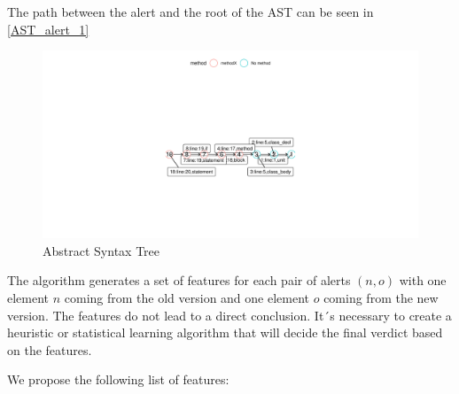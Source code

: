 \documentclass[
]{article}
\begin{document}
\normalsize

The path between the alert and the root of the AST can be seen in
\ref{AST_alert_1}

\small

\begin{figure}[H]
\includegraphics[width=1\linewidth]{match_algorithm_description_files/figure-latex/unnamed-chunk-7-1} \caption{Abstract Syntax Tree \label{AST_alert_1}}\label{fig:unnamed-chunk-7}
\end{figure}

\normalsize

The algorithm generates a set of features for each pair of alerts
\((n,o)\) with one element \(n\) coming from the old version and one
element \(o\) coming from the new version. The features do not lead to a
direct conclusion. It´s necessary to create a heuristic or statistical
learning algorithm that will decide the final verdict based on the
features.

We propose the following list of features:
\end{document}
